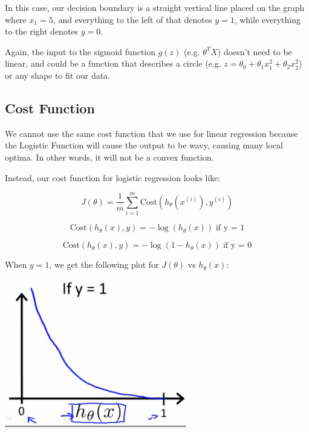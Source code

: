 \documentclass[UTF8]{article}
\begin{document}
In this case, our decision boundary is a straight vertical line placed on the graph where $x_1=5$, and everything to the left of that denotes $y = 1$, while everything to the right denotes $y = 0$.

Again, the input to the sigmoid function $g(z)$ (e.g. $\theta^TX$) doesn't need to be linear, and could be a function that describes a circle (e.g. $z=\theta_0+\theta_1x^2_1+\theta_2x^2_2$) or any shape to fit our data.

\subsection{Cost Function}

We cannot use the same cost function that we use for linear regression because the Logistic Function will cause the output to be wavy, causing many local optima. In other words, it will not be a convex function.

Instead, our cost function for logistic regression looks like:

\[ J(\theta) = \dfrac{1}{m} \sum_{i=1}^m \mathrm{Cost}(h_\theta(x^{(i)}),y^{(i)}) \]

\[ \mathrm{Cost}(h_\theta(x),y) = -\log(h_\theta(x)) \;  \text{if y = 1} \]

\[ \mathrm{Cost}(h_\theta(x),y) = -\log(1-h_\theta(x)) \;  \text{if y = 0} \]

When $y = 1$, we get the following plot for $J(\theta)$ vs $h_\theta(x)$:

\includegraphics[width = \textwidth]{NotePics/6_4_1.png}
\end{document}

